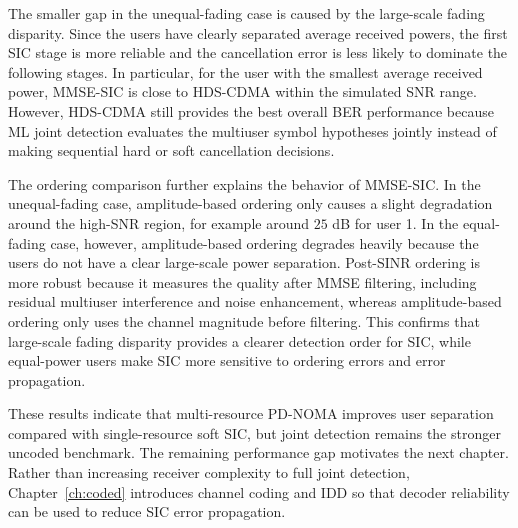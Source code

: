 The smaller gap in the unequal-fading case is caused by the large-scale fading disparity. Since the users have clearly separated average received powers, the first SIC stage is more reliable and the cancellation error is less likely to dominate the following stages. In particular, for the user with the smallest average received power, MMSE-SIC is close to HDS-CDMA within the simulated SNR range. However, HDS-CDMA still provides the best overall BER performance because ML joint detection evaluates the multiuser symbol hypotheses jointly instead of making sequential hard or soft cancellation decisions.

The ordering comparison further explains the behavior of MMSE-SIC. In the unequal-fading case, amplitude-based ordering only causes a slight degradation around the high-SNR region, for example around $25$ dB for user 1. In the equal-fading case, however, amplitude-based ordering degrades heavily because the users do not have a clear large-scale power separation. Post-SINR ordering is more robust because it measures the quality after MMSE filtering, including residual multiuser interference and noise enhancement, whereas amplitude-based ordering only uses the channel magnitude before filtering. This confirms that large-scale fading disparity provides a clearer detection order for SIC, while equal-power users make SIC more sensitive to ordering errors and error propagation.

These results indicate that multi-resource PD-NOMA improves user separation compared with single-resource soft SIC, but joint detection remains the stronger uncoded benchmark. The remaining performance gap motivates the next chapter. Rather than increasing receiver complexity to full joint detection, Chapter~\ref{ch:coded} introduces channel coding and IDD so that decoder reliability can be used to reduce SIC error propagation.
